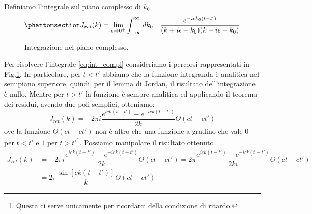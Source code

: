 Definiamo l'integrale sul piano complesso di $k_0$
\begin{equation}\phantomsection\label{eq:int_compl}
J_{ret}(k)=\lim_{\epsilon\to0^+} \int^{\infty}_{-\infty} dk_0\quad \dfrac{e^{-ick_0(t-t')}}{(k+i\epsilon+k_0)(k-i\epsilon-k_0)}
\end{equation}
\begin{figure}[H]
    \centering
    \qquad
    \caption{Integrazione nel piano complesso.}%
    \label{fig:Residuo}%
\end{figure}
Per risolvere l'integrale \eqref{eq:int_compl} consideriamo i percorsi rappresentati in Fig.\ref{fig:Residuo}. In particolare, per $t<t'$ abbiamo che la funzione integranda è analitica nel semipiano superiore, quindi, per il lemma di Jordan, il risultato dell'integrazione è nullo.
Mentre per $t>t'$ la funzione è sempre analitica ed applicando il teorema dei residui, avendo due poli semplici, otteniamo:
 \begin{equation}
J_{ret}(k)=-2\pi i \dfrac{e^{ick(t-t')}-e^{-ick(t-t')}}{2k}\Theta(ct-ct')
\end{equation}
ove la funzione $\Theta(ct-ct')$ non è altro che una funzione a gradino che vale $0$ per $t<t'$ e $1$ per $t>t'$\footnote{Questa ci serve unicamente per ricordarci della condizione di ritardo.}.
Possiamo manipolare il risultato ottenuto
 \begin{equation}
 \begin{aligned}
      J_{ret}(k)&=-2\pi i \dfrac{e^{ick(t-t')}-e^{-ick(t-t')}}{2k}\Theta(ct-ct')=  2\pi\dfrac{e^{ick(t-t')}-e^{-ick(t-t')}}{2ki}\Theta(ct-ct')\\
      &=2\pi\dfrac{\sin{[ck(t-t')]}}{k}\Theta(ct-ct')
 \end{aligned}
\end{equation}

